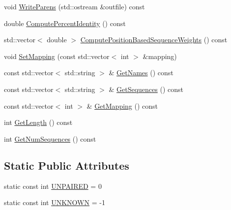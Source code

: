 \begin{DoxyCompactItemize}
void \hyperlink{class_c_o_n_t_r_a_l_i_g_n_1_1_s_struct_a6b12fb398bcf932a1cc414b8f6da0648}{Write\+Parens} (std\+::ostream \&outfile) const 
\item 
double \hyperlink{class_c_o_n_t_r_a_l_i_g_n_1_1_s_struct_abcab3b62ee1c201279042de4fdf3bd3f}{Compute\+Percent\+Identity} () const 
\item 
std\+::vector$<$ double $>$ \hyperlink{class_c_o_n_t_r_a_l_i_g_n_1_1_s_struct_acdb93561a8330235e2bf0dae94c3d1f2}{Compute\+Position\+Based\+Sequence\+Weights} () const 
\item 
void \hyperlink{class_c_o_n_t_r_a_l_i_g_n_1_1_s_struct_a9a2bebbc61b1ff49a5599c8d72930809}{Set\+Mapping} (const std\+::vector$<$ int $>$ \&mapping)
\item 
const std\+::vector$<$ std\+::string $>$ \& \hyperlink{class_c_o_n_t_r_a_l_i_g_n_1_1_s_struct_a78fb1ed337b35efb124726902f5b684f}{Get\+Names} () const 
\item 
const std\+::vector$<$ std\+::string $>$ \& \hyperlink{class_c_o_n_t_r_a_l_i_g_n_1_1_s_struct_a43155b630769a016f444a5bb8dadf1ee}{Get\+Sequences} () const 
\item 
const std\+::vector$<$ int $>$ \& \hyperlink{class_c_o_n_t_r_a_l_i_g_n_1_1_s_struct_a4395e3ed2963400780ec7e59fdb9a336}{Get\+Mapping} () const 
\item 
int \hyperlink{class_c_o_n_t_r_a_l_i_g_n_1_1_s_struct_aceffcc0e00015eff2c5e1ef419a811e0}{Get\+Length} () const 
\item 
int \hyperlink{class_c_o_n_t_r_a_l_i_g_n_1_1_s_struct_a44cfdfe184b885fc6fd9402f9d66e742}{Get\+Num\+Sequences} () const 
\end{DoxyCompactItemize}
\subsection*{Static Public Attributes}
\begin{DoxyCompactItemize}
\item 
static const int \hyperlink{class_c_o_n_t_r_a_l_i_g_n_1_1_s_struct_a65509ae93cf1bcb551d780653c721a56}{U\+N\+P\+A\+I\+R\+E\+D} = 0
\item 
static const int \hyperlink{class_c_o_n_t_r_a_l_i_g_n_1_1_s_struct_a5158068f84b0eea15da8d3f43572581a}{U\+N\+K\+N\+O\+W\+N} = -\/1
\end{DoxyCompactItemize}


